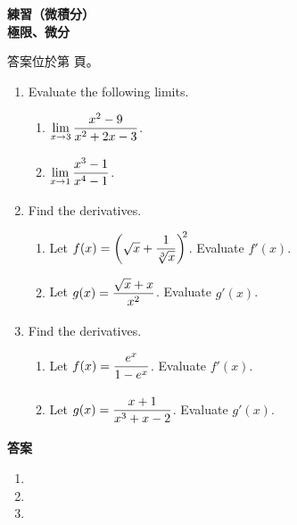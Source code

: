 \documentclass[10pt]{article}
\newcommand*{\fraction}[2]{\rule[-.8\baselineskip]{0pt}{2\baselineskip}\dfrac{#1}{#2}}
\renewcommand*{\maketitle}{{%
  \bfseries
  \LARGE 練習（微積分） \\
  \large 極限、微分 \par
}}
\begin{document}
\maketitle
\medskip
答案位於第 \pageref{answer} 頁。
\begin{enumerate}[label=\arabic*.,align=left,leftmargin=*,labelsep=.5em]
  \item Evaluate the following limits.
  \begin{enumerate}[label=(\alph*),left=0pt]
    \item $\lim\limits_{x \to 3}\fraction{x^2-9}{x^2+2x-3}$.
    \item $\lim\limits_{x \to 1} \fraction{x^3-1}{x^4-1}$.
  \end{enumerate}
  \item Find the derivatives.
  \begin{enumerate}[label=(\alph*),left=0pt]
    \item Let $f(x) = \biggl(\sqrt{x} + \fraction{1}{\sqrt[3]{x}}\biggr)^{\!\!2}$. Evaluate $f'(x)$.
    \item Let $g(x) = \fraction{\sqrt{x}+x}{x^2}$. Evaluate $g'(x)$.
  \end{enumerate}
  \item Find the derivatives.
  \begin{enumerate}[label=(\alph*),left=0pt]
    \item Let $f(x) = \fraction{e^x}{1-e^x}$. Evaluate $f'(x)$.
    \item Let $g(x) = \fraction{x+1}{x^3+x-2}$. Evaluate $g'(x)$.
  \end{enumerate}
\end{enumerate}

\newpage
\label{answer}
{\bfseries\large 答案 \par}
\begin{enumerate}[label=\arabic*.,align=left,leftmargin=*,labelsep=.3em]
  \item
  \item
  \item
\end{enumerate}
\end{document}
